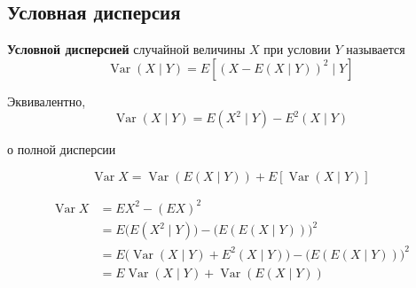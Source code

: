 \documentclass[12pt,a4paper]{article}
\begin{document}
\subsection{Условная дисперсия}

\begin{definition}

\textbf{Условной дисперсией} случайной величины $X$ при условии $Y$ называется
\[
\operatorname{Var}(X\mid Y)
=
E\left[
(X-E(X\mid Y))^2
\mid Y
\right]
\]

Эквивалентно,
\[
\operatorname{Var}(X\mid Y)
=
E(X^2\mid Y)-E^2(X\mid Y)
\]

\end{definition}

\begin{theorem}{о полной дисперсии}

\[
\operatorname{Var}X
=
\operatorname{Var}(E(X\mid Y))
+
E[\operatorname{Var}(X\mid Y)]
\]

\end{theorem}

\begin{proofbox}{}

\[
\begin{aligned}
\operatorname{Var}X
&=
EX^2-(EX)^2\\
&=
E\bigl(E(X^2\mid Y)\bigr)
-
\bigl(E(E(X\mid Y))\bigr)^2\\
&=
E\bigl(\operatorname{Var}(X\mid Y)+E^2(X\mid Y)\bigr)
-
\bigl(E(E(X\mid Y))\bigr)^2\\
&=
E\operatorname{Var}(X\mid Y)
+
\operatorname{Var}(E(X\mid Y))
\end{aligned}
\]

\end{proofbox}
\end{document}
